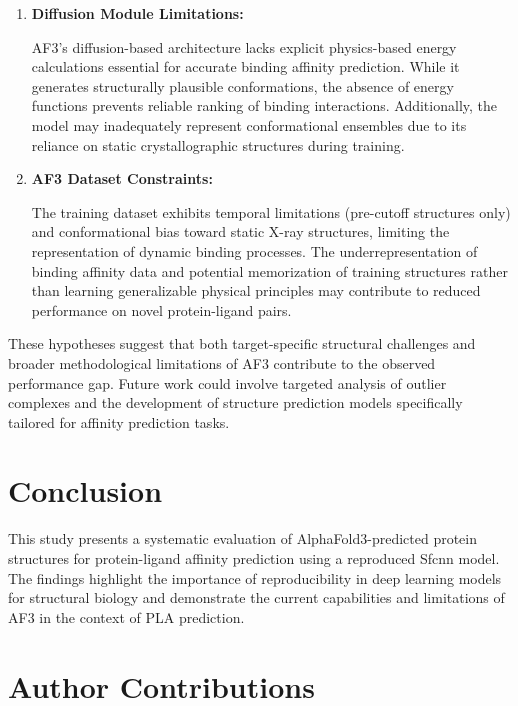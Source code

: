 \documentclass[unnumsec,webpdf,contemporary,large]{oup-authoring-template}
\theoremstyle{thmstyleone}%
\theoremstyle{thmstyletwo}%
\theoremstyle{thmstylethree}%
\begin{document}
\begin{enumerate}
    \item \textbf{Diffusion Module Limitations:} 
    
    AF3's diffusion-based architecture lacks explicit 
    physics-based energy calculations essential for accurate binding affinity prediction. 
    While it generates structurally plausible conformations, 
    the absence of energy functions prevents reliable ranking 
    of binding interactions. Additionally, 
    the model may inadequately represent conformational 
    ensembles due to its reliance on static crystallographic 
    structures during training.

    \item \textbf{AF3 Dataset Constraints:} 
     
    The training dataset exhibits temporal limitations 
    (pre-cutoff structures only) and conformational 
    bias toward static X-ray structures, 
    limiting the representation of dynamic binding processes. 
    The underrepresentation of binding affinity data and 
    potential memorization of training structures rather 
    than learning generalizable physical principles may 
    contribute to reduced performance on novel 
    protein-ligand pairs.

\end{enumerate}

These hypotheses suggest that both target-specific structural challenges and broader methodological 
limitations of AF3 contribute to the observed performance gap. Future work could involve targeted analysis of outlier complexes and the development of structure prediction models specifically tailored for affinity prediction tasks.

\section{Conclusion}
This study presents a systematic evaluation of AlphaFold3-predicted protein structures 
for protein-ligand affinity prediction using a reproduced Sfcnn model. 
The findings highlight the importance of reproducibility in deep learning models for 
structural biology and demonstrate the current capabilities and limitations of AF3 in 
the context of PLA prediction. 


\section{Author Contributions}
\end{document}
